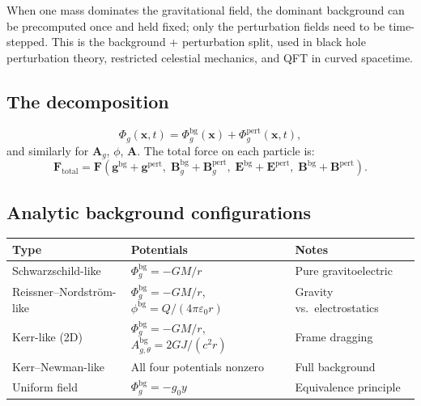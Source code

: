 \documentclass[11pt,a4paper]{article}
\newcommand{\vv}[1]{\mathbf{#1}}
\newcommand{\Phig}{\Phi_g}
\newcommand{\Ag}{\vv{A}_g}
\begin{document}
When one mass dominates the gravitational field, the dominant background can be precomputed once and held fixed; only the perturbation fields need to be time-stepped.  This is the background + perturbation split, used in black hole perturbation theory, restricted celestial mechanics, and QFT in curved spacetime.

\subsection{The decomposition}

\begin{equation}
  \Phig(\vv{x},t) = \Phig^{\mathrm{bg}}(\vv{x}) + \Phig^{\mathrm{pert}}(\vv{x},t),
\end{equation}
and similarly for $\Ag$, $\phi$, $\vv{A}$.  The total force on each particle is:
\begin{equation}
  \vv{F}_{\mathrm{total}} = \vv{F}(\vv{g}^{\mathrm{bg}}+\vv{g}^{\mathrm{pert}},\;\vv{B}_g^{\mathrm{bg}}+\vv{B}_g^{\mathrm{pert}},\;\vv{E}^{\mathrm{bg}}+\vv{E}^{\mathrm{pert}},\;\vv{B}^{\mathrm{bg}}+\vv{B}^{\mathrm{pert}}).
\end{equation}

\subsection{Analytic background configurations}

\begin{center}
\begin{tabular}{@{}L{3.5cm}L{4.5cm}L{5cm}@{}}
\toprule
\textbf{Type} & \textbf{Potentials} & \textbf{Notes} \\
\midrule
Schwarzschild-like & $\Phig^{\mathrm{bg}} = -GM/r$ & Pure gravitoelectric \\[4pt]
Reissner--Nordstr\"{o}m-like & $\Phig^{\mathrm{bg}} = -GM/r$,\; $\phi^{\mathrm{bg}} = Q/(4\pi\varepsilon_0 r)$ & Gravity vs.\ electrostatics \\[4pt]
Kerr-like (2D) & $\Phig^{\mathrm{bg}} = -GM/r$,\; $A_{g,\theta}^{\mathrm{bg}} = 2GJ/(c^2 r)$ & Frame dragging \\[4pt]
Kerr--Newman-like & All four potentials nonzero & Full background \\[4pt]
Uniform field & $\Phig^{\mathrm{bg}} = -g_0 y$ & Equivalence principle \\
\bottomrule
\end{tabular}
\end{center}
\end{document}
